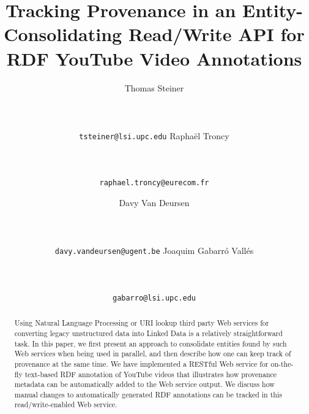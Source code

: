 \documentclass{acm_proc_article-sp}
\begin{document}
\title{Tracking Provenance in an Entity-Consolidating Read/Write API for RDF YouTube Video Annotations}



\author{
\alignauthor Thomas Steiner\\
       \\
       \\
       \\
       \texttt{tsteiner@lsi.upc.edu}
\alignauthor Rapha\"{e}l Troncy\\
       \\
       \\
       \\
       \texttt{raphael.troncy@eurecom.fr}
\and \alignauthor Davy Van Deursen\\
       \\
       \\
       \\
       \texttt{davy.vandeursen@ugent.be}
\alignauthor Joaquim Gabarr\'{o} Vall\'{e}s\\
       \\
       \\
       \\
       \texttt{gabarro@lsi.upc.edu}
}

\maketitle


\begin{abstract}
Using Natural Language Processing or URI lookup third party Web services for converting legacy unstructured data into
Linked Data is a relatively straightforward task. In this paper, we first present an approach to consolidate entities
found by such Web services when being used in parallel, and then describe how one can keep track of provenance at the
same time. We have implemented a RESTful Web service for on-the-fly text-based RDF annotation of YouTube videos that
illustrates how provenance metadata can be automatically added to the Web service output. We discuss how manual changes
to automatically generated RDF annotations can be tracked in this read/write-enabled Web service.
\end{abstract}
\end{document}
